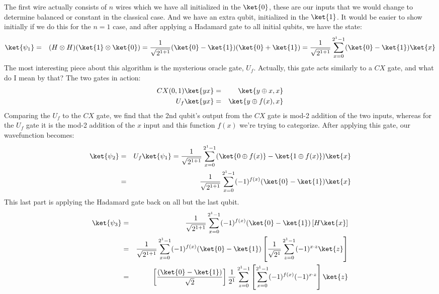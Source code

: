 \documentclass[preprint,aps,prd,nofootinbib,superscriptaddress]{revtex4-2}
\begin{document}
The first wire actually consists of $n$ wires which we have all initialized in the $\ket{0}$, these are our inputs that we would change to determine balanced or constant in the classical case. And we have an extra qubit, initialized in the $\ket{1}$. It would be easier to show initially if we do this for the $n=1$ case, and after applying a Hadamard gate to all initial qubits, we have the state:
%
\begin{eqnarray}
\ket{\psi_1} &=& (H \otimes H)(\ket{1} \otimes \ket{0}) = \frac{1}{\sqrt{2^{1+1}}} (\ket{0} - \ket{1})(\ket{0} + \ket{1}) = \frac{1}{\sqrt{2^{1+1}}} \sum \limits_{x=0}^{2^1 - 1}(\ket{0} - \ket{1})\ket{x}
\end{eqnarray}
%
The most interesting piece about this algorithm is the mysterious oracle gate, $U_f$. Actually, this gate acts similarly to a $CX$ gate, and what do I mean by that? The two gates in action:
%
\begin{eqnarray}
CX(0,1)\ket{yx} &=& \ket{y\oplus x, x}
\nonumber \\
U_f\ket{yx} &=& \ket{y\oplus f(x), x}
\end{eqnarray}
%
Comparing the $U_f$ to the $CX$ gate, we find that the 2nd qubit's output from the $CX$ gate is mod-2 addition of the two inputs, whereas for the $U_f$ gate it is the mod-2 addition of the $x$ input and this function $f(x)$ we're trying to categorize. After applying this gate, our wavefunction becomes: 
%
\begin{eqnarray}
\ket{\psi_2} &=& U_f\ket{\psi_1} = \frac{1}{\sqrt{2^{1+1}}} \sum \limits_{x=0}^{2^1 - 1}(\ket{0\oplus f(x)} - \ket{1\oplus f(x)})\ket{x}
\nonumber \\
&=& \frac{1}{\sqrt{2^{1+1}}} \sum \limits_{x=0}^{2^1 - 1} (-1)^{f(x)}(\ket{0} - \ket{1})\ket{x}
\end{eqnarray}
%
This last part is applying the Hadamard gate back on all but the last qubit. 
%
\begin{eqnarray}
\ket{\psi_3} &=& \frac{1}{\sqrt{2^{1+1}}} \sum \limits_{x=0}^{2^1 - 1} (-1)^{f(x)}(\ket{0} - \ket{1})\left[H\ket{x}\right]
\nonumber \\
&=& \frac{1}{\sqrt{2^{1+1}}} \sum \limits_{x=0}^{2^1 - 1} (-1)^{f(x)}(\ket{0} - \ket{1})\left[\frac{1}{\sqrt{2^1}}\sum \limits_{z=0}^{2^1 - 1} (-1)^{x \cdot z}\ket{z}\right]
\nonumber \\
&=& \left[\frac{(\ket{0} - \ket{1})}{\sqrt{2}}\right] \frac{1}{2^1} \sum \limits_{z=0}^{2^1 - 1} \left[ \sum \limits_{x=0}^{2^1 - 1} (-1)^{f(x)} (-1)^{x \cdot z} \right]\ket{z}
\end{eqnarray}
\end{document}
